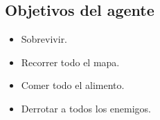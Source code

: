 \subsection{Objetivos del agente}

\begin{itemize}
\item Sobrevivir.
\item Recorrer todo el mapa.
\item Comer todo el alimento.
\item Derrotar a todos los enemigos.
\end{itemize}
